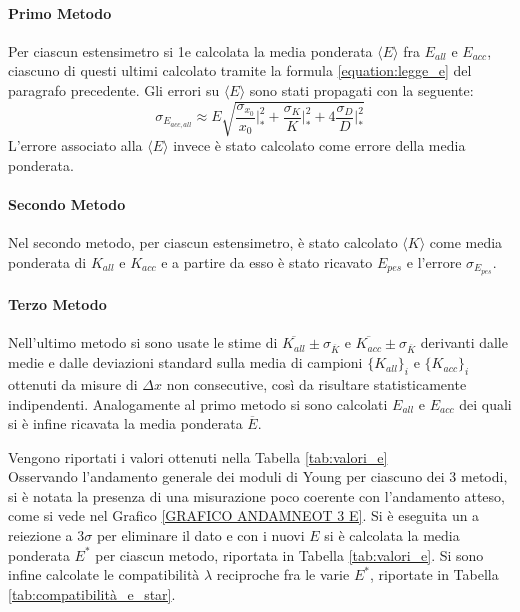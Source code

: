 \documentclass[a4paper,11pt,oneside]{article}
\begin{document}
\paragraph{Primo Metodo}
Per ciascun estensimetro si 1e calcolata la media ponderata $\langle E \rangle $ fra $E_{all}$ e $E_{acc}$, ciascuno di questi ultimi calcolato tramite la formula \ref{equation:legge_e} del paragrafo precedente. Gli errori su $\langle E \rangle$ sono stati propagati con la seguente:
\begin{equation}
    \label{eq:propagazione_particolare}
    \sigma_{E_{acc, all}} \approx E\sqrt{\frac{\sigma_{x_{0}}}{x_{0}}\Big|_{\ast}^2+\frac{\sigma_{K}}{K}\Big|_{\ast}^2+4\frac{\sigma_{D}}{D}\Big|_{\ast}^2}
\end{equation}
L'errore associato alla $\langle E \rangle $ invece è stato calcolato come errore della media ponderata.

\paragraph{Secondo Metodo}
Nel secondo metodo, per ciascun estensimetro, è stato calcolato $\langle K \rangle $ come media ponderata di $K_{all}$ e $K_{acc}$ e a partire da esso è stato ricavato $E_{pes}$ e l'errore $\sigma_{E_{pes}}$.

\paragraph{Terzo Metodo}
Nell'ultimo metodo si sono usate le stime di $\overline{K_{all}} \pm \sigma_{\overline{K}}$ e $\overline{K_{acc}} \pm \sigma_{\overline{K}}$ derivanti dalle medie e dalle deviazioni standard sulla media di campioni $\{ K_{all} \}_i$ e $\{ K_{acc}\}_i $ ottenuti da misure di $\Delta x$ non consecutive, così da risultare statisticamente indipendenti. Analogamente al primo metodo si sono calcolati $E_{all}$ e $E_{acc}$ dei quali si è infine ricavata la media ponderata $\overline{E}$.

Vengono riportati i valori ottenuti nella Tabella \ref{tab:valori_e}\\


Osservando l'andamento generale dei moduli di Young per ciascuno dei 3 metodi, si è notata la presenza di una misurazione poco coerente con l'andamento atteso, come si vede nel Grafico \ref{GRAFICO ANDAMNEOT 3 E}.
Si è eseguita un a reiezione a $3\sigma$ per eliminare il dato e con i nuovi $E$ si è calcolata la media ponderata $E^{\ast}$ per ciascun metodo, riportata in Tabella \ref{tab:valori_e}. Si sono infine calcolate le compatibilità $\lambda$ reciproche fra le varie $E^{\ast}$, riportate in Tabella \ref{tab:compatibilità_e_star}.
\end{document}
